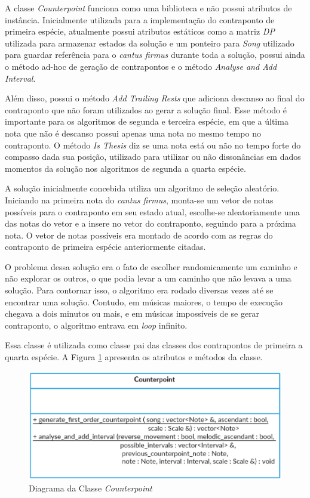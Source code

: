     A classe \textit{Counterpoint} funciona como uma biblioteca e não possui atributos de instância. Inicialmente utilizada para a implementação do contraponto de primeira espécie, atualmente possui atributos estáticos como a matriz \textit{DP} utilizada para armazenar estados da solução e um ponteiro para \textit{Song} utilizado para guardar referência para o \textit{cantus firmus} durante toda a solução, possui ainda o método ad-hoc de geração de contrapontos e o método \textit{Analyse and Add Interval}.

    Além disso, possui o método \textit{Add Trailing Rests} que adiciona descanso ao final do contraponto que não foram utilizados ao gerar a solução final. Esse método é importante para os algoritmos de segunda e terceira espécie, em que a última nota que não é descanso possui apenas uma nota no mesmo tempo no contraponto. O método \textit{Is Thesis} diz se uma nota está ou não no tempo forte do compasso dada sua posição, utilizado para utilizar ou não dissonâncias em dados momentos da solução nos algoritmos de segunda a quarta espécie.

    A solução inicialmente concebida utiliza um algoritmo de seleção aleatório. Iniciando na primeira nota do \textit{cantus firmus}, monta-se um vetor de notas possíveis para o contraponto em seu estado atual, escolhe-se aleatoriamente uma das notas do vetor e a insere no vetor do contraponto, seguindo para a próxima nota. O vetor de notas possíveis era montado de acordo com as regras do contraponto de primeira espécie anteriormente citadas.

    O problema dessa solução era o fato de escolher randomicamente um caminho e não explorar os outros, o que podia levar a um caminho que não levava a uma solução. Para contornar isso, o algoritmo era rodado diversas vezes até se encontrar uma solução. Contudo, em músicas maiores, o tempo de execução chegava a dois minutos ou mais, e em músicas impossíveis de se gerar contraponto, o algoritmo entrava em \textit{loop} infinito.

    Essa classe é utilizada como classe pai das classes dos contrapontos de primeira a quarta espécie. A Figura \ref{counterpointclass} apresenta os atributos e métodos da classe.

    \begin{figure}[htb]
      \centering
      \includegraphics[scale=0.7]{figuras/counterpointclass.eps}
      \caption{Diagrama da Classe \textit{Counterpoint}}
      \label{counterpointclass}
    \end{figure}


